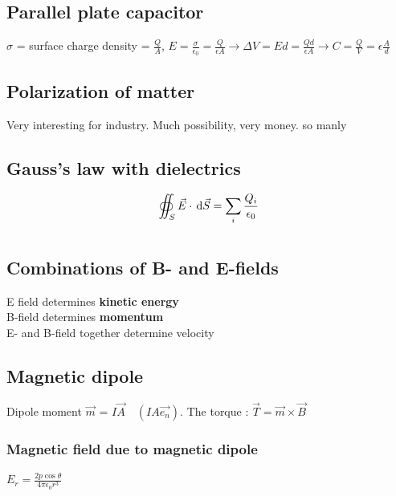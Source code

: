 \documentclass[12pt,a4paper]{article}
\begin{document}
\subsection{Parallel plate capacitor}
$\sigma$ = surface charge density = $\frac{Q}{A}$, $E = \frac{\sigma}{\epsilon_0} = \frac{Q}{\epsilon A} \to \Delta V = Ed = \frac{Qd}{\epsilon A} \to C = \frac{Q}{V} = \epsilon\frac{A}{d}$

\subsection{Polarization of matter}
Very interesting for industry. Much possibility, very money.
so manly

\subsection{Gauss's law with dielectrics}
\[\oiint_S \vec{E}\cdot \, \mathrm d \vec{S}= \sum_i \frac{Q_i}{\epsilon_0}\]
\section{}
\section{}
\subsection{}
\subsection{}
\subsection{Combinations of B- and E-fields}
\begin{boite}
	E field determines \textbf{kinetic energy}\\
	B-field determines \textbf{momentum}\\
	E- and B-field together determine velocity
\end{boite}
\subsection{Magnetic dipole}
Dipole moment $\vec{m}$ = $I\vec{A} \quad (IA\vec{e_n})$. The torque : $\vec{T} = \vec{m} \times \vec{B}$
\subsubsection{Magnetic field due to magnetic dipole}
$E_r = \frac{2p\cos\theta}{4\pi\epsilon_0 r^3}$
\end{document}
